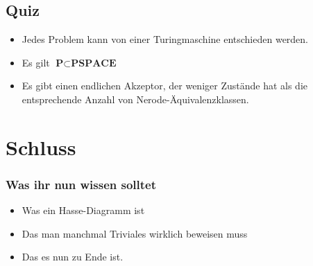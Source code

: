 





\graphicspath{{../figures/}}




\subsection{Quiz}
\begin{frame}
	\begin{itemize}
		\item<1-> Jedes Problem kann von einer Turingmaschine entschieden werden.
		\item<3-> Es gilt $ \textbf{P} \subset \textbf{PSPACE} $
		\item<5-> Es gibt einen endlichen Akzeptor, der weniger Zustände hat als die entsprechende Anzahl von Nerode-Äquivalenzklassen.
	\end{itemize}
\end{frame}





\section{Schluss}
\begin{frame}
	\frametitle{Was ihr nun wissen solltet}
	\begin{itemize}
		\item Was ein Hasse-Diagramm ist
		\item Das man manchmal Triviales wirklich beweisen muss
		\item Das es nun zu Ende ist.
	\end{itemize}
\end{frame}


